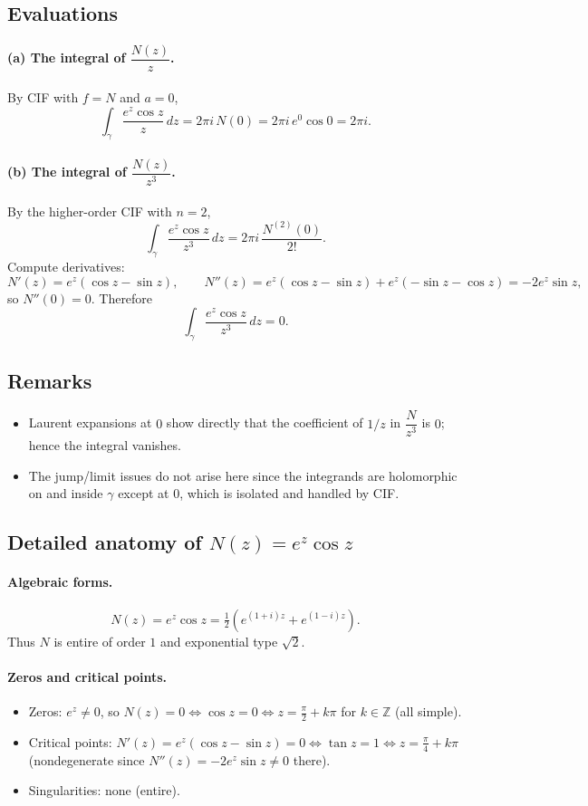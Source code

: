 \documentclass[11pt]{article}
\begin{document}
	\subsection*{Evaluations}
	
	\paragraph{(a) The integral of $\dfrac{N(z)}{z}$.}
	By CIF with $f=N$ and $a=0$,
	\[
	\int_{\gamma}\frac{e^{z}\cos z}{z}\,dz
	=2\pi i\,N(0)
	=2\pi i\,e^{0}\cos 0
	=2\pi i.
	\]
	
	\paragraph{(b) The integral of $\dfrac{N(z)}{z^{3}}$.}
	By the higher-order CIF with $n=2$,
	\[
	\int_{\gamma}\frac{e^{z}\cos z}{z^{3}}\,dz
	=2\pi i\,\frac{N^{(2)}(0)}{2!}.
	\]
	Compute derivatives:
	\[
	N'(z)=e^{z}(\cos z-\sin z),\qquad
	N''(z)=e^{z}(\cos z-\sin z)+e^{z}(-\sin z-\cos z)=-2e^{z}\sin z,
	\]
	so $N''(0)=0$. Therefore
	\[
	\int_{\gamma}\frac{e^{z}\cos z}{z^{3}}\,dz=0.
	\]
	
	\subsection*{Remarks}
	\begin{itemize}
		\item Laurent expansions at $0$ show directly that the coefficient of $1/z$ in $\dfrac{N}{z^{3}}$ is $0$; hence the integral vanishes.
		\item The jump/limit issues do not arise here since the integrands are holomorphic on and inside $\gamma$ except at $0$, which is isolated and handled by CIF.
	\end{itemize}
	
	
	\subsection*{Detailed anatomy of \(N(z)=e^{z}\cos z\)}
	
	\paragraph{Algebraic forms.}
	\[
	N(z)=e^{z}\cos z=\tfrac12\!\left(e^{(1+i)z}+e^{(1-i)z}\right).
	\]
	Thus \(N\) is entire of order \(1\) and exponential type \(\sqrt2\).
	
	\paragraph{Zeros and critical points.}
	\begin{itemize}
		\item Zeros: \(e^{z}\neq0\), so \(N(z)=0\iff \cos z=0\iff z=\frac{\pi}{2}+k\pi\) for \(k\in\mathbb{Z}\) (all simple).
		\item Critical points: \(N'(z)=e^{z}(\cos z-\sin z)=0\iff \tan z=1\iff z=\frac{\pi}{4}+k\pi\) (nondegenerate since \(N''(z)=-2e^{z}\sin z\neq0\) there).
		\item Singularities: none (entire).
	\end{itemize}
	
\end{document}
